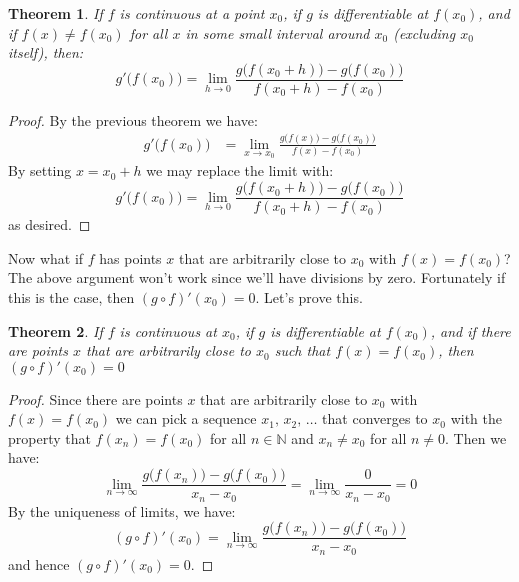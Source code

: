 \documentclass{article}
\theoremstyle{plain}
\newtheorem{theorem}{Theorem}
\begin{document}
    \begin{theorem}
        If $f$ is continuous at a point $x_{0}$, if $g$ is differentiable at
        $f(x_{0})$, and if $f(x)\ne{f}(x_{0})$ for all $x$ in some small
        interval around $x_{0}$ (excluding $x_{0}$ itself),
        then:
        \begin{equation}
            g'\big(f(x_{0})\big)=
                \lim_{h\rightarrow{0}}
                \frac{g\big(f(x_{0}+h)\big)-g\big(f(x_{0})\big)}
                     {f(x_{0}+h)-f(x_{0})}
        \end{equation}
    \end{theorem}
    \begin{proof}
        By the previous theorem we have:
        \begin{align}
            g'\big(f(x_{0})\big)
            &=\lim_{x\rightarrow{x}_{0}}
                \frac{g\big(f(x)\big)-g\big(f(x_{0})\big)}{f(x)-f(x_{0})}
        \end{align}
        By setting $x=x_{0}+h$ we may replace the limit with:
        \begin{equation}
            g'\big(f(x_{0})\big)=
                \lim_{h\rightarrow{0}}
                \frac{g\big(f(x_{0}+h)\big)-g\big(f(x_{0})\big)}
                     {f(x_{0}+h)-f(x_{0})}
        \end{equation}
        as desired.
    \end{proof}
    Now what if $f$ has points $x$ that are arbitrarily close to $x_{0}$ with
    $f(x)=f(x_{0})$? The above argument won't work since we'll have divisions
    by zero. Fortunately if this is the case, then $(g\circ{f})'(x_{0})=0$.
    Let's prove this.
    \begin{theorem}
        If $f$ is continuous at $x_{0}$, if $g$ is differentiable at $f(x_{0})$,
        and if there are points $x$ that are arbitrarily close to $x_{0}$ such
        that $f(x)=f(x_{0})$, then $(g\circ{f})'(x_{0})=0$
    \end{theorem}
    \begin{proof}
        Since there are points $x$ that are arbitrarily close to $x_{0}$ with
        $f(x)=f(x_{0})$ we can pick a sequence $x_{1},\,x_{2},\,\dots$ that
        converges to $x_{0}$ with the property that $f(x_{n})=f(x_{0})$ for all
        $n\in\mathbb{N}$ and $x_{n}\ne{x}_{0}$ for all $n\ne{0}$. Then we have:
        \begin{equation}
            \lim_{n\rightarrow\infty}
                \frac{g\big(f(x_{n})\big)-g\big(f(x_{0})\big)}{x_{n}-x_{0}}
            =\lim_{n\rightarrow\infty}
                \frac{0}{x_{n}-x_{0}}
            =0
        \end{equation}
        By the uniqueness of limits, we have:
        \begin{equation}
            (g\circ{f})'(x_{0})
            =\lim_{n\rightarrow\infty}
                \frac{g\big(f(x_{n})\big)-g\big(f(x_{0})\big)}{x_{n}-x_{0}}
        \end{equation}
        and hence $(g\circ{f})'(x_{0})=0$.
    \end{proof}
\end{document}
